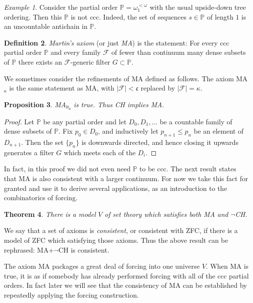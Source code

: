 \documentclass[11pt,oneside]{amsbook}
\newcommand{\PP}{\mathbb P}
\theoremstyle{definition}
\theoremstyle{plain}
\newtheorem{theorem}{Theorem}[section]
\newtheorem{proposition}[theorem]{Proposition}
\theoremstyle{definition}
\newtheorem{definition}[theorem]{Definition}
\theoremstyle{remark}
\newtheorem{example}[theorem]{Example}
\numberwithin{equation}{section}
\numberwithin{figure}{section}
\begin{document}
\begin{example}
  Consider the partial order $\PP=\omega_1^{<\omega}$ with the usual upside-down tree ordering. Then this $\PP$ is not ccc. Indeed, the set of sequences $s\in\PP$ of length $1$ is an uncountable antichain in $\PP$.
\end{example}

\begin{definition}
  \emph{Martin's axiom} (or just \emph{MA}) is the statement: For every ccc partial order $\PP$ and every family $\mathcal F$ of fewer than continuum many dense subsets of $\PP$ there exists an $\mathcal F$-generic filter $G\subset\PP$.
\end{definition}

We sometimes consider the refinements of MA defined as follows. The axiom MA$_\kappa$ is the same statement as MA, with $|\mathcal F|<\mathfrak c$ replaced by $|\mathcal F|=\kappa$.

\begin{proposition}
  \label{prop:ma-aleph0}
  MA$_{\aleph_0}$ is true. Thus CH implies MA.
\end{proposition}

\begin{proof}
  Let $\PP$ be any partial order and let $D_0,D_1,\ldots$ be a countable family of dense subsets of $\PP$. Fix $p_0\in D_0$, and inductively let $p_{n+1}\leq p_n$ be an element of $D_{n+1}$. Then the set $\{p_n\}$ is downwards directed, and hence closing it upwards generates a filter $G$ which meets each of the $D_i$.
\end{proof}

In fact, in this proof we did not even need $\PP$ to be ccc. The next result states that MA is also consistent with a larger continuum. For now we take this fact for granted and use it to derive several applications, as an introduction to the combinatorics of forcing.

\begin{theorem}
  There is a model $V$ of set theory which satisfies both MA and $\neg$CH.
\end{theorem}

We say that a set of axioms is \emph{consistent}, or consistent with ZFC, if there is a model of ZFC which satisfying those axioms. Thus the above result can be rephrased: MA+$\neg$CH is consistent.

The axiom MA packages a great deal of forcing into one universe $V$. When MA is true, it is as if somebody has already performed forcing with all of the ccc partial orders. In fact later we will see that the consistency of MA can be established by repeatedly applying the forcing construction.
\end{document}
